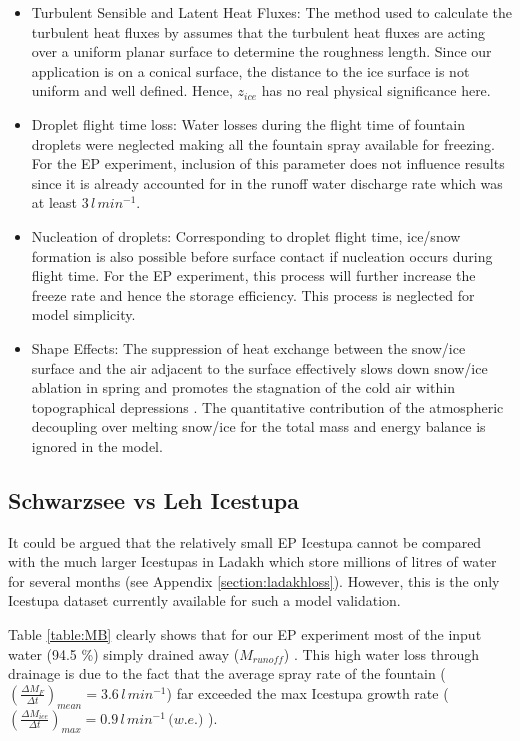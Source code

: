\documentclass[utf8]{frontiersSCNS} %
\begin{document}
\begin{itemize}

\item  Turbulent Sensible and Latent Heat Fluxes: The method used to calculate the turbulent heat fluxes by
  \cite{Garratt_1992} assumes that the turbulent heat fluxes are acting over a uniform planar surface to determine the
  roughness length. Since our application is on a conical surface, the distance to the ice surface is not
  uniform and well defined. Hence, $z_{ice}$ has no real physical significance here.

\item Droplet flight time loss: Water losses during the flight time of fountain droplets were neglected making all the
  fountain spray available for freezing. For the EP experiment, inclusion of this parameter does not influence
  results since it is already accounted for in the runoff water discharge rate which was at least $3\, l\,min^{-1}$.

\item Nucleation of droplets: Corresponding to droplet flight time, ice/snow formation is also possible before surface
  contact if nucleation occurs during flight time. For the EP experiment, this process will further increase
  the freeze rate and hence the storage efficiency. This process is neglected for model simplicity.
\item Shape Effects: The suppression of heat exchange between the snow/ice surface and the air adjacent to the surface
  effectively slows down snow/ice ablation in spring and promotes the stagnation of the cold air within topographical
  depressions \citep{Fujita_2010}. The quantitative contribution of the atmospheric decoupling over melting snow/ice
  for the total mass and energy balance is ignored in the model.

\end{itemize}

\subsection{Schwarzsee vs Leh Icestupa}
  
It could be argued that the relatively small EP Icestupa cannot be compared with the much larger Icestupas in
Ladakh which store millions of litres of water for several months (see Appendix \ref{section:ladakhloss}). However,
this is the only Icestupa dataset currently available for such a model validation.

Table \ref{table:MB} clearly shows that for our EP experiment most of the input water (94.5 \%) simply drained away
($M_{runoff}$) . This high water loss through drainage is due to the fact that the average spray rate of the fountain
($(\frac{\Delta M_{F}}{\Delta t})_{mean} = 3.6\, l\,min^{-1}$) far exceeded the max Icestupa growth rate
($(\frac{\Delta M_{ice}}{\Delta t})_{max} = 0.9\, l\,min^{-1}\, \textit{(w.e.)}$ ).
\end{document}
